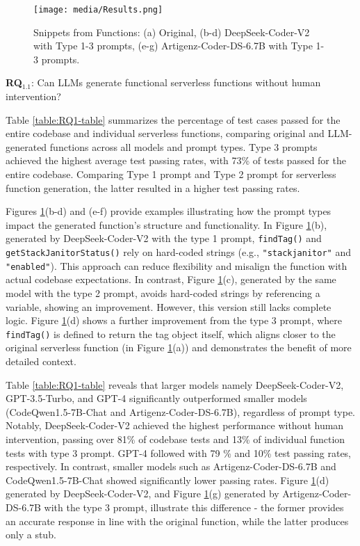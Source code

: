 
\begin{figure}
    \centering
    \texttt{[image: media/Results.png]}
    \caption{Snippets from Functions: (a) Original, (b-d) DeepSeek-Coder-V2 with Type 1-3 prompts, (e-g) Artigenz-Coder-DS-6.7B with Type 1-3 prompts.}
    \label{fig:examples}
    \vspace{-15pt}
\end{figure}

\label{sec:rq1-1}
\textbf{RQ}$_{1.1}$: Can LLMs generate functional serverless functions without human intervention?

Table \ref{table:RQ1-table} summarizes the percentage of test cases passed for the entire codebase and individual serverless functions, comparing original and LLM-generated functions across all models and prompt types. Type 3 prompts achieved the highest average test passing rates,  with 73\% of tests passed for the entire codebase. Comparing Type 1 prompt and Type 2 prompt for serverless function generation, the latter resulted in a higher test passing rates. 

Figures \ref{fig:examples}(b-d) and {}(e-f) provide examples illustrating how the prompt types impact the generated function's structure and functionality. In Figure \ref{fig:examples}(b), generated by DeepSeek-Coder-V2 with the type 1 prompt, \texttt{findTag()} and \texttt{getStackJanitorStatus()} rely on hard-coded strings (e.g., \texttt{"stackjanitor"} and \texttt{"enabled"}). This approach can reduce flexibility and misalign the function with actual codebase expectations. In contrast, Figure \ref{fig:examples}(c), generated by the same model with the type 2 prompt, avoids hard-coded strings by referencing a variable, showing an improvement. However, this version still lacks complete logic. Figure \ref{fig:examples}(d) shows a further improvement from the type 3 prompt, where \texttt{findTag()} is defined to return the tag object itself, which aligns closer to the original serverless function (in Figure \ref{fig:examples}(a)) and demonstrates the benefit of more detailed context.

Table \ref{table:RQ1-table} reveals that larger models namely DeepSeek-Coder-V2, GPT-3.5-Turbo, and GPT-4 significantly outperformed smaller models (CodeQwen1.5-7B-Chat and Artigenz-Coder-DS-6.7B), regardless of prompt type. Notably, DeepSeek-Coder-V2 achieved the highest performance without human intervention, passing over 81\% of codebase tests and 13\% of individual function tests with type 3 prompt. GPT-4 followed with 79   \% and 10\% test passing rates, respectively. In contrast, smaller models such as Artigenz-Coder-DS-6.7B and CodeQwen1.5-7B-Chat showed significantly lower passing rates. Figure \ref{fig:examples}(d) generated by DeepSeek-Coder-V2, and Figure \ref{fig:examples}(g) generated by Artigenz-Coder-DS-6.7B with the type 3 prompt, illustrate this difference - the former provides an accurate response in line with the original function, while the latter produces only a stub.  

